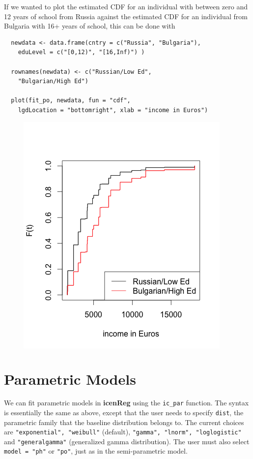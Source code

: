 \documentclass[11pt]{report}
\begin{document}
  If we wanted to plot the estimated CDF  
  for an individual with between
  zero and 12 years of school from Russia against the estimated CDF for an
  individual from Bulgaria with 16+ years of school, this can be done with 
  
  \begin{verbatim}
  newdata <- data.frame(cntry = c("Russia", "Bulgaria"),
    eduLevel = c("[0,12)", "[16,Inf)") )
    
  rownames(newdata) <- c("Russian/Low Ed", 
    "Bulgarian/High Ed")

  plot(fit_po, newdata, fun = "cdf", 
    lgdLocation = "bottomright", xlab = "income in Euros")
  \end{verbatim}
  
  \begin{figure}
  \includegraphics{essIncCDF.png}
  \label{figure:RusvBulg}
  \end{figure}
  
  \section{Parametric Models}
  
  We can fit parametric models in {\bf icenReg} using the \texttt{ic\_par} function. 
  The syntax is essentially the same as above, except that the user needs to specify
  \texttt{dist}, the parametric family that the baseline distribution belongs to. 
  The current choices are \texttt{"exponential", "weibull"} (default), 
  \texttt{"gamma", "lnorm", "loglogistic"} and \texttt{"generalgamma"} (generalized 
  gamma distribution). The user must also select \texttt{model = "ph"} or \texttt{"po"}, 
  just as in the semi-parametric model. 
  
\end{document}
